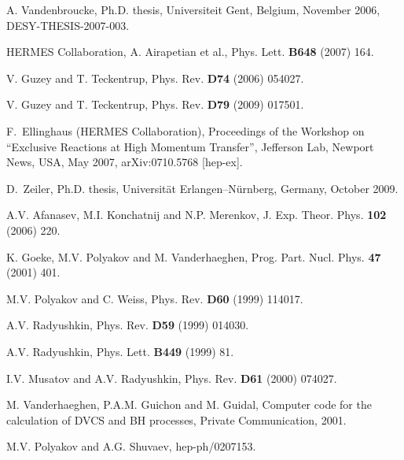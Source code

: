 \begin{thebibliography}{99}
A. Vandenbroucke, Ph.D. thesis, Universiteit Gent, Belgium, November 2006, DESY-THESIS-2007-003.

HERMES Collaboration, A. Airapetian et al.,   %
Phys. Lett. {\bf B648} (2007) 164.


V. Guzey and T. Teckentrup,
Phys. Rev. \textbf{D74} (2006) 054027.


V. Guzey and T. Teckentrup, 
Phys. Rev. {\bf D79} (2009) 017501.





F.~Ellinghaus (HERMES Collaboration),  
Proceedings of the Workshop on ``Exclusive Reactions at High Momentum Transfer'',
Jefferson Lab, Newport News, USA, May 2007, arXiv:0710.5768 [hep-ex]. 



D.~Zeiler, 
Ph.D. thesis, Universit\"at Erlangen--N\"urnberg, Germany, October 2009.


A.V. Afanasev, M.I. Konchatnij and N.P. Merenkov,
J. Exp. Theor. Phys. {\bf 102} (2006) 220.


K. Goeke, M.V. Polyakov and M. Vanderhaeghen,
Prog. Part. Nucl. Phys. {\bf 47} (2001) 401.


M.V. Polyakov and C. Weiss, 
Phys. Rev. {\bf D60} (1999) 114017.


A.V. Radyushkin, 
Phys. Rev. {\bf D59} (1999) 014030.

A.V. Radyushkin, 
Phys. Lett. {\bf B449} (1999) 81.


I.V. Musatov and A.V. Radyushkin,
Phys. Rev. {\bf D61} (2000) 074027.


M. Vanderhaeghen, P.A.M. Guichon and M. Guidal, Computer code for the calculation
of DVCS and BH processes, 
Private Communication, 2001.




M.V. Polyakov and A.G. Shuvaev,  %
hep-ph/0207153.



\end{thebibliography}
